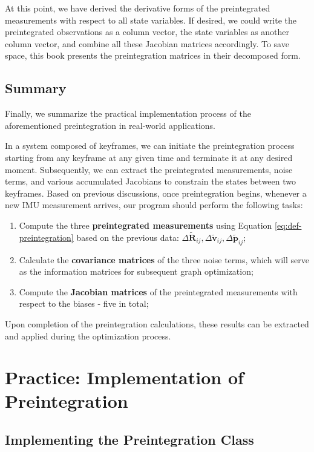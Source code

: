 At this point, we have derived the derivative forms of the preintegrated measurements with respect to all state variables. If desired, we could write the preintegrated observations as a column vector, the state variables as another column vector, and combine all these Jacobian matrices accordingly. To save space, this book presents the preintegration matrices in their decomposed form.

\subsection{Summary}
Finally, we summarize the practical implementation process of the aforementioned preintegration in real-world applications.

In a system composed of keyframes, we can initiate the preintegration process starting from any keyframe at any given time and terminate it at any desired moment. Subsequently, we can extract the preintegrated measurements, noise terms, and various accumulated Jacobians to constrain the states between two keyframes. Based on previous discussions, once preintegration begins, whenever a new IMU measurement arrives, our program should perform the following tasks:
\begin{enumerate}
	\item 
	Compute the three \textbf{preintegrated measurements} using Equation \eqref{eq:def-preintegration} based on the previous data: $\Delta \tilde{\bm{R}}_{ij}, \Delta \tilde{\bm{v}}_{ij}, \Delta \tilde{\bm{p}}_{ij}$;
	\item Calculate the \textbf{covariance matrices} of the three noise terms, which will serve as the information matrices for subsequent graph optimization;
	\item Compute the \textbf{Jacobian matrices} of the preintegrated measurements with respect to the biases - five in total;
\end{enumerate}

Upon completion of the preintegration calculations, these results can be extracted and applied during the optimization process.

\section{Practice: Implementation of Preintegration}
\subsection{Implementing the Preintegration Class}

